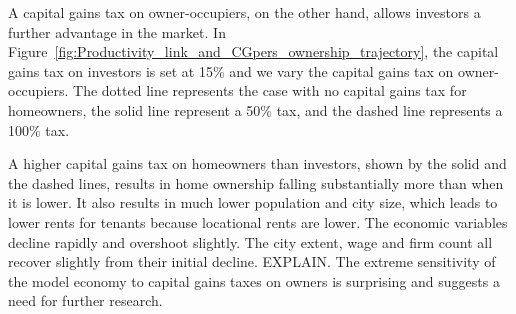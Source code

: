 A capital gains tax on owner-occupiers, on the other hand, allows investors a further advantage in the market. In Figure~\ref{fig:Productivity_link_and_CGpers_ownership_trajectory}, the capital gains tax on investors is set at 15\% and we vary the capital gains tax on owner-occupiers. The dotted line represents the case with no capital gains tax for homeowners, the solid line represent a 50\% tax, and the dashed line represents a 100\% tax.



A higher capital gains tax on homeowners than investors, shown by the solid and the dashed lines, results in home ownership falling substantially more than when it is lower. It also results in much lower population and city size, which leads to lower rents for tenants because locational rents are lower.
The economic variables decline rapidly and overshoot slightly. The city extent, wage and firm count all recover slightly from their initial decline. {\color{red} EXPLAIN.} 
The extreme sensitivity of the model economy to capital gains taxes on owners is surprising and suggests a need for further research. 

